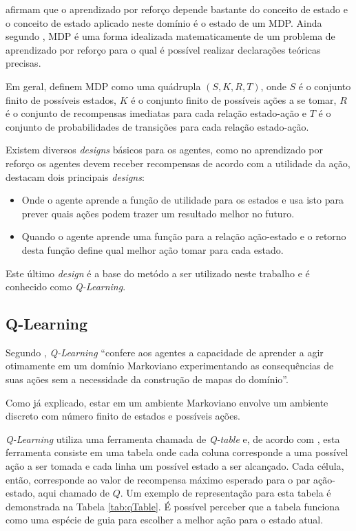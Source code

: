  afirmam que o aprendizado por reforço depende bastante do
conceito de estado e o conceito de estado aplicado neste domínio é o estado de um MDP. Ainda segundo
, MDP é uma forma idealizada matematicamente de um problema de
aprendizado por reforço para o qual é possível realizar declarações teóricas precisas.

Em geral,  definem MDP como uma quádrupla $(S, K, R, T)$, onde $S$ é o
conjunto finito de possíveis estados, $K$ é o conjunto finito de possíveis ações a se tomar, $R$ é o
conjunto de recompensas imediatas para cada relação estado-ação e $T$ é o conjunto de probabilidades
de transições para cada relação estado-ação. 

Existem diversos \textit{designs} básicos para os agentes, como no aprendizado por reforço os
agentes devem receber recompensas de acordo com a utilidade da ação,
 destacam dois principais \textit{designs}:

\begin{itemize}
    \item Onde o agente aprende a função de utilidade para os estados e usa isto para prever quais
    ações podem trazer um resultado melhor no futuro.
    
    \item Quando o agente aprende uma função para a relação ação-estado e o retorno desta função
    define qual melhor ação tomar para cada estado.
\end{itemize}

Este último \textit{design} é a base do metódo a ser utilizado neste trabalho e é conhecido como
\textit{Q-Learning}.

\subsection{Q-Learning}\label{qlearning}

Segundo , \textit{Q-Learning} ``confere aos agentes a capacidade de
aprender a agir otimamente em um domínio Markoviano experimentando as consequências de suas ações
sem a necessidade da construção de mapas do domínio''.

Como já explicado, estar em um ambiente Markoviano envolve um ambiente discreto com número finito de
estados e possíveis ações.

\textit{Q-Learning} utiliza uma ferramenta chamada de \textit{Q-table} e, de acordo com
, esta ferramenta consiste em uma tabela onde cada coluna corresponde a
uma possível ação a ser tomada e cada linha um possível estado a ser alcançado. Cada célula, então,
corresponde ao valor de recompensa máximo esperado para o par ação-estado, aqui chamado de $Q$. Um
exemplo de representação para esta tabela é demonstrada na Tabela \ref{tab:qTable}. É possível
perceber que a tabela funciona como uma espécie de guia para escolher a melhor ação para o estado
atual.

